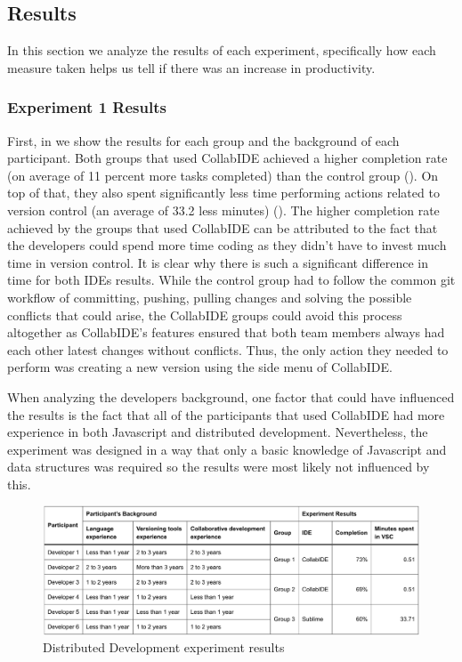 	

\subsection{Results}

In this section we analyze the results of each experiment, specifically how each measure taken helps us tell if there was an increase in productivity.

\subsubsection{Experiment 1 Results}

First, in  we show the results for each group and the background of each participant. Both groups that used CollabIDE achieved a higher completion rate (on average of 11 percent more tasks completed) than the control group (). On top of that, they also spent significantly less time performing actions related to version control (an average of 33.2 less minutes) (). The higher completion rate achieved by the groups that used CollabIDE can be attributed to the fact that the developers could spend more time coding as they didn’t have to invest much time in version control. It is clear why there is such a significant difference in time for both IDEs results. While the control group had to follow the common git workflow of committing, pushing, pulling changes and solving the possible conflicts that could arise, the CollabIDE groups could avoid this process altogether as CollabIDE’s features ensured that both team members always had each other latest changes without conflicts. Thus, the only action they needed to perform was creating a new version using the side menu of CollabIDE.

When analyzing the developers background, one factor that could have influenced the results is the fact that all of the participants that used CollabIDE had more experience in both Javascript and distributed development. Nevertheless, the experiment was designed in a way that only a basic knowledge of Javascript and data structures was required so the results were most likely not influenced by this.

\begin{figure}[htbp]
  \centering
  \includegraphics[width=1\textwidth]{img/resultsTableCollaborative}
  \caption{Distributed Development experiment results}
  \label{fig:resultsTableCollaborative}
\end{figure}

